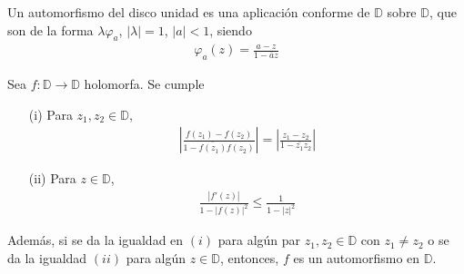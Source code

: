\begin{defi}Un automorfismo del disco unidad es una aplicación conforme de $\mathbb{D}$ sobre $\mathbb{D}$, que son de la forma $\lambda\varphi_a$, $|\lambda| = 1$, $|a| < 1$, siendo
\begin{align*}
    \varphi_a(z) = \frac{a-z}{1-\overline{a}z}
\end{align*}
\end{defi}

\begin{teo}
Sea $f: \mathbb{D} \longrightarrow \mathbb{D}$ holomorfa. Se cumple
\begin{enumerate}
    \item[(i)] Para $z_1,z_2 \in \mathbb{D}$,
    \begin{align*}
        \left| \frac{f(z_1) - f(z_2)}{1 -\overline{f(z_1)}f(z_2)} \right| = \left| \frac{z_1 - z_2}{1 - \overline{z_1}z_2} \right|
    \end{align*}
    \item[(ii)] Para $z \in \mathbb{D}$,
    \begin{align*}
        \frac{|f'(z)|}{1-|f(z)|^2} \leq \frac{1}{1-|z|^2}
    \end{align*}
\end{enumerate}
Además, si se da la igualdad en $(i)$ para algún par $z_1,z_2 \in \mathbb{D}$ con $z_1 \not = z_2$ o se da la igualdad $(ii)$ para algún $z \in \mathbb{D}$, entonces, $f$ es un automorfismo en $\mathbb{D}$.
\end{teo}
